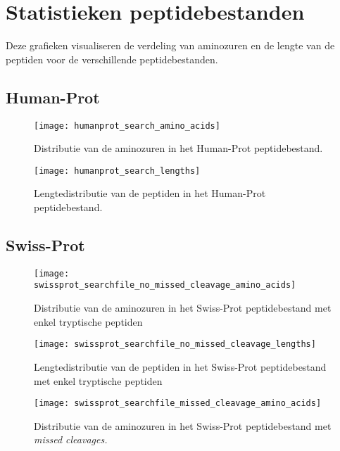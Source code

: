 \chapter{Statistieken peptidebestanden}\label{ch:appendix-statistieken-peptidebestanden}
Deze grafieken visualiseren de verdeling van aminozuren en de lengte van de peptiden voor de verschillende peptidebestanden.

\section{Human-Prot}\label{sec:human-prot-stats}
\begin{figure}[H]
    \centering
    \texttt{[image: humanprot\_search\_amino\_acids]}
    \caption{Distributie van de aminozuren in het Human-Prot peptidebestand.}
    \label{fig:humanprot_search_amino_acids}
\end{figure}

\begin{figure}[H]
    \centering
    \texttt{[image: humanprot\_search\_lengths]}
    \caption{Lengtedistributie van de peptiden in het Human-Prot peptidebestand.}
    \label{fig:humanprot_search_distr}
\end{figure}

\section{Swiss-Prot}\label{sec:swiss-prot-stats}
\begin{figure}[H]
    \centering
    \texttt{[image: swissprot\_searchfile\_no\_missed\_cleavage\_amino\_acids]}
    \caption{Distributie van de aminozuren in het Swiss-Prot peptidebestand met enkel tryptische peptiden}
    \label{fig:swissprot_search_no_missed_cleavage_amino_acids}
\end{figure}

\begin{figure}[H]
    \centering
    \texttt{[image: swissprot\_searchfile\_no\_missed\_cleavage\_lengths]}
    \caption{Lengtedistributie van de peptiden in het Swiss-Prot peptidebestand met enkel tryptische peptiden}
    \label{fig:swissprot_search_no_missed_cleavage_distr}
\end{figure}

\begin{figure}[H]
    \centering
    \texttt{[image: swissprot\_searchfile\_missed\_cleavage\_amino\_acids]}
    \caption{Distributie van de aminozuren in het Swiss-Prot peptidebestand met \textit{missed cleavages.}}
    \label{fig:swissprot_search_missed_cleavage_amino_acids}
\end{figure}

